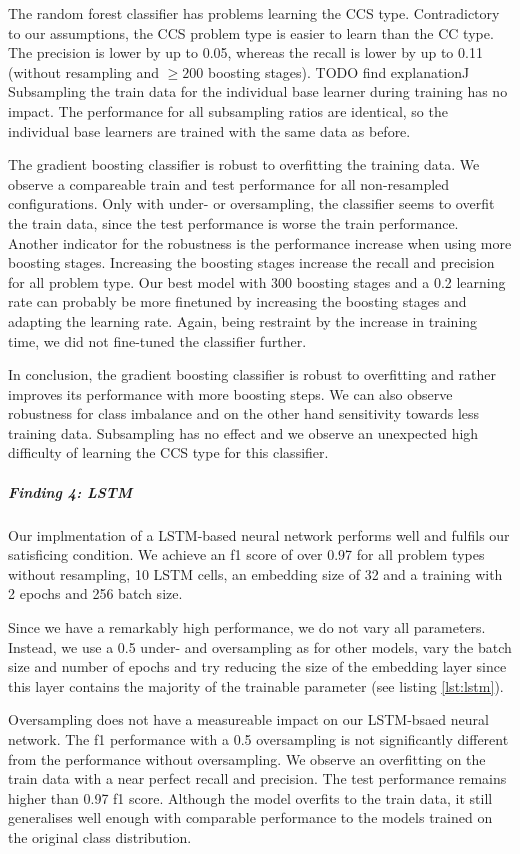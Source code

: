 The random forest classifier has problems learning the CCS type. Contradictory to our assumptions, the CCS problem type is easier to learn than the CC type. The precision is lower by up to 0.05, whereas the recall is lower by up to 0.11 (without resampling and $\geq 200$ boosting stages). TODO find explanation^^

Subsampling the train data for the individual base learner during training has no impact. The performance for all subsampling ratios are identical, so the individual base learners are trained with the same data as before.

The gradient boosting classifier is robust to overfitting the training data. We observe a compareable train and test performance for all non-resampled configurations. Only with under- or oversampling, the classifier seems to overfit the train data, since the test performance is worse the train performance. 
Another indicator for the robustness is the performance increase when using more boosting stages. Increasing the boosting stages increase the recall and precision for all problem type. Our best model with 300 boosting stages and a 0.2 learning rate can probably be more finetuned by increasing the boosting stages and adapting the learning rate. Again, being restraint by the increase in training time, we did not fine-tuned the classifier further.

In conclusion, the gradient boosting classifier is robust to overfitting and rather improves its performance with more boosting steps. We can also observe robustness for class imbalance and on the other hand sensitivity towards less training data. Subsampling has no effect and we observe an unexpected high difficulty of learning the CCS type for this classifier.


\subparagraph{Finding 4: LSTM}
Our implmentation of a LSTM-based neural network performs well and fulfils our satisficing condition. We achieve an f1 score of over 0.97 for all problem types without resampling, 10 LSTM cells, an embedding size of 32 and a training with 2 epochs and 256 batch size. 


Since we have a remarkably high performance, we do not vary all parameters. Instead, we use a 0.5 under- and oversampling as for other models, vary the batch size and number of epochs and try reducing the size of the embedding layer since this layer contains the majority of the trainable parameter (see listing \ref{lst:lstm}).


Oversampling does not have a measureable impact on our LSTM-bsaed neural network. The f1 performance with a 0.5 oversampling is not significantly different from the performance without oversampling. We observe an overfitting on the train data with a near perfect recall and precision. The test performance remains higher than 0.97 f1 score. Although the model overfits to the train data, it still generalises well enough with comparable performance to the models trained on the original class distribution.


